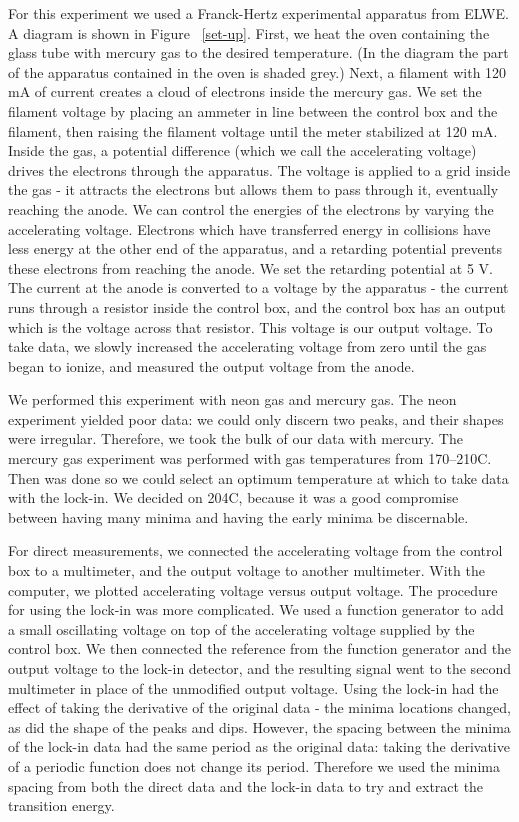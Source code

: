 \documentclass[prb,preprint]{revtex4-1}
\begin{document}
For this experiment we used a Franck-Hertz experimental apparatus from ELWE. A diagram is shown in Figure ~\ref{set-up}. 
First, we heat the oven containing the glass tube with mercury gas to the desired temperature. 
(In the diagram the part of the apparatus contained in the oven is shaded grey.) 
Next, a filament with 120 mA of current creates a cloud of electrons inside the mercury gas. 
We set the filament voltage by placing an ammeter in line between the control box and the filament, then raising the filament voltage until the meter stabilized at 120 mA. 
Inside the gas, a potential difference (which we call the accelerating voltage) drives the electrons through the apparatus. 
The voltage is applied to a grid inside the gas - it attracts the electrons but allows them to pass through it, eventually reaching the anode. 
We can control the energies of the electrons by varying the accelerating voltage. 
Electrons which have transferred energy in collisions have less energy at the other end of the apparatus, and a retarding potential prevents these electrons from reaching the anode. 
We set the retarding potential at 5 V. %
The current at the anode is converted to a voltage by the apparatus - the current runs through a resistor inside the control box, and the control box has an output which is the voltage across that resistor. 
This voltage is our output voltage. 
To take data, we slowly increased the accelerating voltage from zero until the gas began to ionize, and measured the output voltage from the anode. 

We performed this experiment with neon gas and mercury gas. 
The neon experiment yielded poor data: we could only discern two peaks, and their shapes were irregular. 
Therefore, we took the bulk of our data with mercury. 
The mercury gas experiment was performed with gas temperatures from 170\degree--210\degree C. 
Then was done so we could select an optimum temperature at which to take data with the lock-in. 
We decided on 204\degree C, because it was a good compromise between having many minima and having the early minima be discernable.  

For direct measurements, we connected the accelerating voltage from the control box to a multimeter, and the output voltage to another multimeter. 
With the computer, we plotted accelerating voltage versus output voltage. 
The procedure for using the lock-in was more complicated. 
We used a function generator to add a small oscillating voltage on top of the accelerating voltage supplied by the control box. 
We then connected the reference from the function generator and the output voltage to the lock-in detector, and the resulting signal went to the second multimeter in place of the unmodified output voltage. 
Using the lock-in had the effect of taking the derivative of the original data - the minima locations changed, as did the shape of the peaks and dips. 
However, the spacing between the minima of the lock-in data had the same period as the original data: taking the derivative of a periodic function does not change its period. 
Therefore we used the minima spacing from both the direct data and the lock-in data to try and extract the transition energy. 
\end{document}
